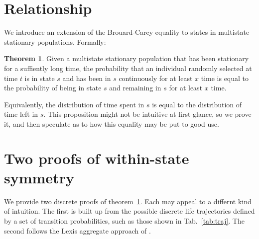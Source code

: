 \documentclass[12pt,oneside,a4paper]{article}
\theoremstyle{definition}
\newtheorem{theorem}{Theorem}[section]
\begin{document}
\section{Relationship}
We introduce an extension of the Brouard-Carey equality to states in multistate stationary populations.
Formally:

\begin{theorem}
\label{th}
Given a multistate stationary population that has been stationary for a suffiently long time, the probability that an individual randomly selected at time $t$ is in state $s$ and has been in $s$ continuously for at least $x$ time is equal to the probability of being in state $s$ and remaining in $s$ for at least $x$ time.
\end{theorem}

Equivalently, the distribution of time spent in $s$ is equal to the distribution of time left in $s$. This proposition
might not be intuitive at first glance, so we prove it, and then speculate
as to how this equality may be put to good use. 


\section{Two proofs of within-state symmetry}
\FloatBarrier

We provide two discrete proofs of theorem~\ref{th}. Each may appeal to a differnt kind of intuition. The first is built up from the possible discrete life trajectories defined by a set of transition probabilities, such as those shown in Tab.~\ref{tab:traj}. The second follows the Lexis aggregate approach of \citet{villavicencioRiffeSymmetires2016}.
\end{document}
